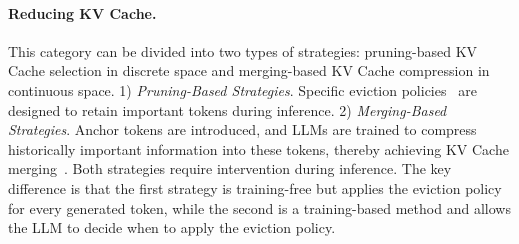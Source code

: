 \paragraph{Reducing KV Cache.}
This category can be divided into two types of strategies: pruning-based KV Cache selection in discrete space and merging-based KV Cache compression in continuous space.
1) \textit{Pruning-Based Strategies}.
Specific eviction policies~\citep{nips23_h2o, iclr24_streamingllm,arxiv24_sepllm} are designed to retain important tokens during inference.
2) \textit{Merging-Based Strategies}.
Anchor tokens are introduced, and LLMs are trained to compress historically important information into these tokens, thereby achieving KV Cache merging~\citep{acl24_anllm}.
Both strategies require intervention during inference. 
The key difference is that the first strategy is training-free but applies the eviction policy for every generated token, while the second is a training-based method and allows the LLM to decide when to apply the eviction policy.

